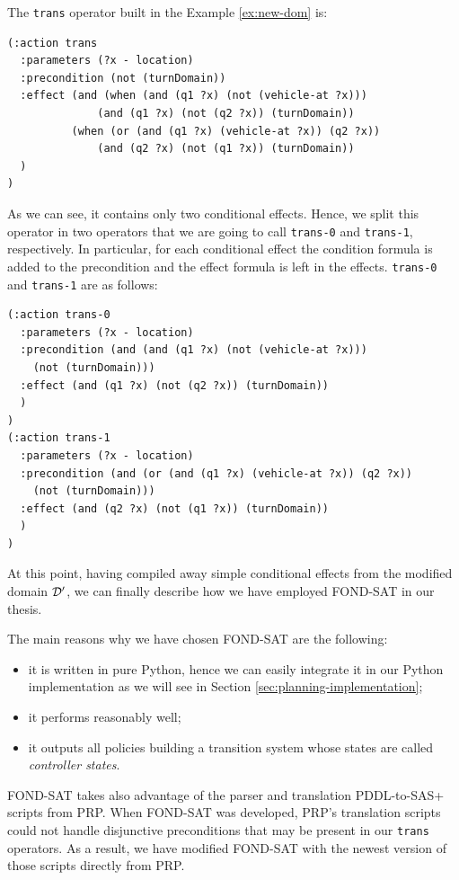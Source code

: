 \begin{example}
The \texttt{trans} operator built in the Example \ref{ex:new-dom} is:
\begin{lstlisting}[language=PDDL, escapechar=£]
(:action trans
  :parameters (?x - location)
  :precondition (not (turnDomain))
  :effect (and (when (and (q1 ?x) (not (vehicle-at ?x)))
              (and (q1 ?x) (not (q2 ?x)) (turnDomain))
          (when (or (and (q1 ?x) (vehicle-at ?x)) (q2 ?x))
              (and (q2 ?x) (not (q1 ?x)) (turnDomain))
  )
)
\end{lstlisting}
As we can see, it contains only two conditional effects. Hence, we split this operator in two operators that we are going to call \texttt{trans-0} and \texttt{trans-1}, respectively. In particular, for each conditional effect the condition formula is added to the precondition and the effect formula is left in the effects. \texttt{trans-0} and \texttt{trans-1} are as follows:
\begin{lstlisting}[language=PDDL, escapechar=£]
(:action trans-0
  :parameters (?x - location)
  :precondition (and (and (q1 ?x) (not (vehicle-at ?x))) 
    (not (turnDomain)))
  :effect (and (q1 ?x) (not (q2 ?x)) (turnDomain))
  )
)
(:action trans-1
  :parameters (?x - location)
  :precondition (and (or (and (q1 ?x) (vehicle-at ?x)) (q2 ?x)) 
    (not (turnDomain)))
  :effect (and (q2 ?x) (not (q1 ?x)) (turnDomain))
  )
)
\end{lstlisting}
\end{example}

At this point, having compiled away simple conditional effects from the modified domain $\mathcal{D}'$, we can finally describe how we have employed FOND-SAT in our thesis.

The main reasons why we have chosen FOND-SAT are the following:
\begin{itemize}
\item it is written in pure Python, hence we can easily integrate it in our Python implementation as we will see in Section \ref{sec:planning-implementation};
\item it performs reasonably well;
\item it outputs all policies building a transition system whose states are called \textit{controller states}.
\end{itemize}
FOND-SAT takes also advantage of the parser and translation PDDL-to-SAS+ scripts from  PRP. When FOND-SAT was developed, PRP's translation scripts could not handle disjunctive preconditions that may be present in our \texttt{trans} operators. As a result, we have modified FOND-SAT with the newest version of those scripts directly from PRP.

